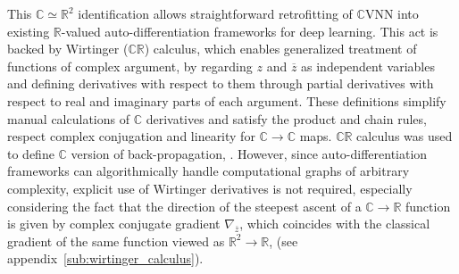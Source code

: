 \documentclass[a4paper,10pt,twocolumn]{article}
\newcommand{\real}{\mathbb{R}}
\newcommand{\cplx}{\mathbb{C}}
\newcommand{\conj}[1]{\overline{#1}}
\begin{document}
This $\cplx \simeq \real^2$ identification allows straightforward retrofitting of $\cplx$VNN
into existing $\real$-valued auto-differentiation frameworks for deep learning. This
act is backed by Wirtinger ($\cplx\real$) calculus, which enables generalized treatment
of functions of complex argument, by regarding $z$ and $\conj{z}$ as independent variables
and defining derivatives with respect to them through partial derivatives with respect
to real and imaginary parts of each argument. These definitions simplify manual calculations
of $\cplx$ derivatives and satisfy the product and chain rules, respect complex conjugation
and linearity for $\cplx \to \cplx$ maps. $\cplx\real$ calculus was used to define $\cplx$
version of back-propagation, \citep{benvenuto_complex_1992,guberman_complex_2016}. However,
since auto-differentiation frameworks can algorithmically handle computational graphs
of arbitrary complexity, explicit use of Wirtinger derivatives is not required, especially
considering the fact that the direction of the steepest ascent of a $\cplx\to \real$
function is given by complex conjugate gradient $\nabla_{\conj{z}}$, which coincides
with the classical gradient of the same function viewed as $\real^2 \to \real$,
(see appendix~\ref{sub:wirtinger_calculus}).
%
%
%
\end{document}
